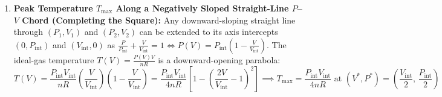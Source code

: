 \begin{formulacard}
\begin{enumerate}
\begin{itemize}
  \end{itemize}
  \item \textbf{Peak Temperature $T_{\max}$ Along a Negatively Sloped Straight-Line $P$--$V$ Chord (Completing the Square):}
  Any downward-sloping straight line through $(P_1, V_1)$ and $(P_2, V_2)$ can be extended to its axis intercepts $(0, P_{\mathrm{int}})$ and $(V_{\mathrm{int}}, 0)$ as $\frac{P}{P_{\mathrm{int}}} + \frac{V}{V_{\mathrm{int}}} = 1 \iff P(V) = P_{\mathrm{int}}\left(1 - \frac{V}{V_{\mathrm{int}}}\right)$. The ideal-gas temperature $T(V) = \frac{P(V)V}{nR}$ is a downward-opening parabola:
  \begin{equation}\label{eq:07:chord-tmax}
    T(V) = \frac{P_{\mathrm{int}}V_{\mathrm{int}}}{nR}\left(\frac{V}{V_{\mathrm{int}}}\right)\left(1 - \frac{V}{V_{\mathrm{int}}}\right) = \frac{P_{\mathrm{int}}V_{\mathrm{int}}}{4nR}\left[1 - \left(\frac{2V}{V_{\mathrm{int}}} - 1\right)^2\right] \implies \boxed{T_{\max} = \frac{P_{\mathrm{int}}V_{\mathrm{int}}}{4nR} \text{ at } \left(V^*, P^*\right) = \left(\frac{V_{\mathrm{int}}}{2},\, \frac{P_{\mathrm{int}}}{2}\right)}
  \end{equation}
\end{enumerate}
\end{formulacard}

